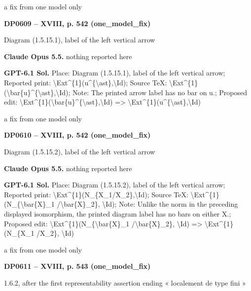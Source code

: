 a fix from one model only\par
\par\noindent\hypertarget{DP0609}{}\textbf{DP0609 -- XVIII, p. 542 (one\_model\_fix)}\par
Diagram (1.5.15.1), label of the left vertical arrow\par
\textbf{Claude Opus 5.5.} nothing reported here\par
\textbf{GPT-6.1 Sol.} Place: Diagram (1.5.15.1), label of the left vertical arrow; Reported print: \textbackslash{}Ext\textasciicircum{}\{1\}(u\textasciicircum{}\{\textbackslash{}ast\},\textbackslash{}Id); Source TeX: \textbackslash{}Ext\textasciicircum{}\{1\}(\textbackslash{}bar\{u\}\textasciicircum{}\{\textbackslash{}ast\},\textbackslash{}Id); Note: The printed arrow label has no bar on u.; Proposed edit: \textbackslash{}Ext\textasciicircum{}\{1\}(\textbackslash{}bar\{u\}\textasciicircum{}\{\textbackslash{}ast\},\textbackslash{}Id) =\allowbreak > \textbackslash{}Ext\textasciicircum{}\{1\}(u\textasciicircum{}\{\textbackslash{}ast\},\textbackslash{}Id)\par
a fix from one model only\par
\par\noindent\hypertarget{DP0610}{}\textbf{DP0610 -- XVIII, p. 542 (one\_model\_fix)}\par
Diagram (1.5.15.2), label of the left vertical arrow\par
\textbf{Claude Opus 5.5.} nothing reported here\par
\textbf{GPT-6.1 Sol.} Place: Diagram (1.5.15.2), label of the left vertical arrow; Reported print: \textbackslash{}Ext\textasciicircum{}\{1\}(N\_\{X\_1/X\_2\},\textbackslash{}Id); Source TeX: \textbackslash{}Ext\textasciicircum{}\{1\}(N\_\{\textbackslash{}bar\{X\}\_1 /\textbackslash{}bar\{X\}\_2\}, \textbackslash{}Id); Note: Unlike the norm in the preceding displayed isomorphism, the printed diagram label has no bars on either X.; Proposed edit: \textbackslash{}Ext\textasciicircum{}\{1\}(N\_\{\textbackslash{}bar\{X\}\_1 /\textbackslash{}bar\{X\}\_2\}, \textbackslash{}Id) =\allowbreak > \textbackslash{}Ext\textasciicircum{}\{1\}(N\_\{X\_1 /X\_2\}, \textbackslash{}Id)\par
a fix from one model only\par
\par\noindent\hypertarget{DP0611}{}\textbf{DP0611 -- XVIII, p. 543 (one\_model\_fix)}\par
1.6.2, after the first representability assertion ending « localement de type fini »\par

